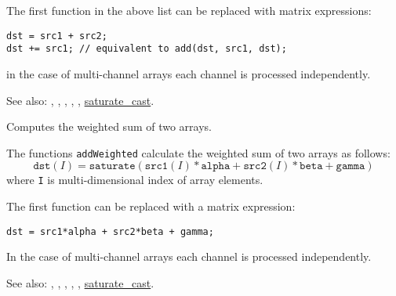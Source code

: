 The first function in the above list can be replaced with matrix expressions:
\begin{lstlisting}
dst = src1 + src2;
dst += src1; // equivalent to add(dst, src1, dst);
\end{lstlisting}

in the case of multi-channel arrays each channel is processed independently.

See also: , , , ,
, \hyperref[cppfunc.saturatecast]{saturate\_cast}.

Computes the weighted sum of two arrays.


\begin{description}
\end{description}

The functions \texttt{addWeighted} calculate the weighted sum of two arrays as follows:
\[\texttt{dst}(I)=\texttt{saturate}(\texttt{src1}(I)*\texttt{alpha} + \texttt{src2}(I)*\texttt{beta} + \texttt{gamma})\]
where \texttt{I} is multi-dimensional index of array elements.

The first function can be replaced with a matrix expression:
\begin{lstlisting}
dst = src1*alpha + src2*beta + gamma;
\end{lstlisting}

In the case of multi-channel arrays each channel is processed independently.

See also: , , , ,
, \hyperref[cppfunc.saturatecast]{saturate\_cast}.

